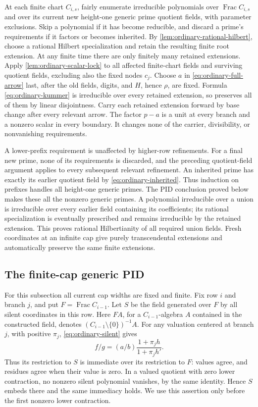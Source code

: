 \documentclass[11pt,reqno]{amsart}
\numberwithin{equation}{section}
\theoremstyle{plain}
\theoremstyle{definition}
\theoremstyle{remark}
\begin{document}
At each finite chart \(C_{i,s}\), fairly enumerate irreducible
polynomials over \(\operatorname{Frac}C_{i,s}\) and over its
current new height-one generic prime
quotient fields, with parameter exclusions. Skip a polynomial
if it has become reducible, and discard a prime's requirements
if it factors or becomes inherited. By
\cref{lem:ordinary-rational-hilbert}, choose a rational Hilbert
specialization and retain the resulting finite root extension.
At any finite time there are only finitely many retained
extensions. Apply \cref{lem:ordinary-scalar-lock} to all affected
finite-chart fields and surviving quotient fields, excluding also
the fixed nodes \(c_j\). Choose \(a\) in
\eqref{eq:ordinary-full-arrow} last, after the old fields, digits,
and \(H\), hence \(\rho\), are fixed. Formula
\eqref{eq:ordinary-kummer} is irreducible over every retained
extension, so preserves all of them by linear disjointness.
Carry each retained extension forward by base change after
every relevant arrow.
The factor \(p-a\) is a unit at every branch and a nonzero
scalar in every boundary. It changes none of the carrier,
divisibility, or nonvanishing requirements.

A lower-prefix requirement is unaffected by higher-row
refinements. For a final new prime, none of its requirements
is discarded, and the preceding quotient-field argument applies
to every subsequent relevant refinement. An inherited prime
has exactly its earlier quotient field by
\eqref{eq:ordinary-inherited}. Thus induction on prefixes
handles all height-one generic primes. The PID conclusion proved
below makes these all the nonzero generic primes.
A polynomial irreducible over a
union is irreducible over every earlier field containing its
coefficients; its rational specialization is eventually
prescribed and remains irreducible by the retained extension.
This proves rational Hilbertianity of all required union fields.
Fresh coordinates at an infinite cap give purely transcendental
extensions and automatically preserve the same finite extensions.

\subsection{The finite-cap generic PID}

For this subsection all current cap widths are fixed and finite.
Fix row \(i\) and branch \(j\), and put
\(F=\operatorname{Frac}C_{i-1}\). Let \(S\) be the field generated
over \(F\) by all silent coordinates in this row.
Here \(F A\), for a \(C_{i-1}\)-algebra \(A\) contained in the
constructed field, denotes \((C_{i-1}\setminus\{0\})^{-1}A\).
For any valuation centered at branch \(j\), with positive
\(\pi_j\), \eqref{eq:ordinary-silent} gives
\[
 f/g=(a/b)\frac{1+\pi_jh}{1+\pi_jh'}.
\]
Thus its restriction to \(S\) is immediate over its restriction
to \(F\): values agree, and residues agree when their value is
zero. In a valued quotient with zero lower contraction, no
nonzero silent polynomial vanishes, by the same identity.
Hence \(S\) embeds there and the same immediacy holds.
We use this assertion only before the first nonzero lower
contraction.
\end{document}

